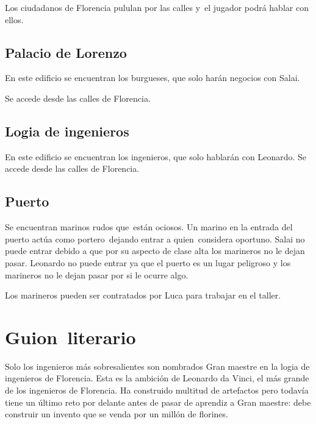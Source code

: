 {
Los ciudadanos de Florencia pululan por las calles y\ el jugador podr\'a hablar con ellos.}

\subsection[Palacio de Lorenzo]{ Palacio de Lorenzo}
\hypertarget{Toc484614261}{}{
En este edificio se encuentran los burgueses, que solo har\'an negocios con Salai.}

{
Se accede desde las calles de Florencia.}

\subsection[Logia de ingenieros]{ Logia de ingenieros}
\hypertarget{Toc484614262}{}{
En este edificio se encuentran los ingenieros, que solo hablar\'an con Leonardo. Se accede desde las calles de
Florencia.}

\subsection[Puerto]{ Puerto}
\hypertarget{Toc484614263}{}{
Se encuentran marinos rudos que\ est\'an ociosos. Un marino en la entrada del puerto act\'ua como portero\ dejando
entrar a quien\ considera oportuno. Salai no puede entrar debido a que por su aspecto de clase alta los marineros no le
dejan pasar. Leonardo no puede entrar ya que el puerto es un lugar peligroso y los marineros no le dejan pasar por si
le ocurre algo.}

{
Los marineros pueden ser contratados por Luca para trabajar en el taller.}

\section[Guion\ literario]{ Guion\ literario}
\label{guionLiterario}
\hypertarget{Toc484614264}{}{
Solo los ingenieros m\'as sobresalientes son nombrados Gran maestre en la logia de ingenieros de Florencia. Esta es la
ambici\'on de Leonardo da Vinci, el m\'as grande de los ingenieros de Florencia. Ha construido multitud de artefactos
pero todav\'ia tiene un \'ultimo reto por delante antes de pasar de aprendiz a Gran maestre: debe construir un invento
que se venda por un mill\'on de florines.}

